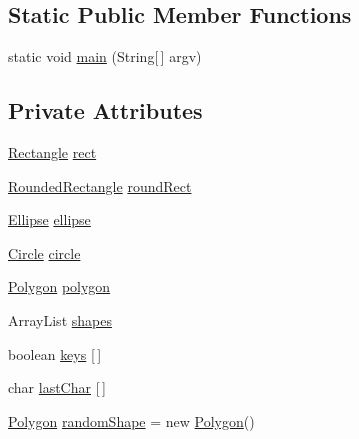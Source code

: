 \subsection*{Static Public Member Functions}
\begin{DoxyCompactItemize}
\item 
static void \mbox{\hyperlink{classorg_1_1newdawn_1_1slick_1_1tests_1_1_shape_test_a4dc07a1d24ad03f8f2927698b7334699}{main}} (String\mbox{[}$\,$\mbox{]} argv)
\end{DoxyCompactItemize}
\subsection*{Private Attributes}
\begin{DoxyCompactItemize}
\item 
\mbox{\hyperlink{classorg_1_1newdawn_1_1slick_1_1geom_1_1_rectangle}{Rectangle}} \mbox{\hyperlink{classorg_1_1newdawn_1_1slick_1_1tests_1_1_shape_test_a4b1ff3f26d40f4da99df6588a2ce932a}{rect}}
\item 
\mbox{\hyperlink{classorg_1_1newdawn_1_1slick_1_1geom_1_1_rounded_rectangle}{Rounded\+Rectangle}} \mbox{\hyperlink{classorg_1_1newdawn_1_1slick_1_1tests_1_1_shape_test_a8b3b14df1900a94b25ea41131c3fac22}{round\+Rect}}
\item 
\mbox{\hyperlink{classorg_1_1newdawn_1_1slick_1_1geom_1_1_ellipse}{Ellipse}} \mbox{\hyperlink{classorg_1_1newdawn_1_1slick_1_1tests_1_1_shape_test_a0337285e2634a3c36400453a8f963757}{ellipse}}
\item 
\mbox{\hyperlink{classorg_1_1newdawn_1_1slick_1_1geom_1_1_circle}{Circle}} \mbox{\hyperlink{classorg_1_1newdawn_1_1slick_1_1tests_1_1_shape_test_a61f5576f235a808e5a41242bedefbca0}{circle}}
\item 
\mbox{\hyperlink{classorg_1_1newdawn_1_1slick_1_1geom_1_1_polygon}{Polygon}} \mbox{\hyperlink{classorg_1_1newdawn_1_1slick_1_1tests_1_1_shape_test_a7a0198760bc6648bf9c28d35b102b7f1}{polygon}}
\item 
Array\+List \mbox{\hyperlink{classorg_1_1newdawn_1_1slick_1_1tests_1_1_shape_test_a860a3cef8eb3e35b677c5ccef30b3ecc}{shapes}}
\item 
boolean \mbox{\hyperlink{classorg_1_1newdawn_1_1slick_1_1tests_1_1_shape_test_abd8d1f480191272d0dc2ad5c9afe14fc}{keys}} \mbox{[}$\,$\mbox{]}
\item 
char \mbox{\hyperlink{classorg_1_1newdawn_1_1slick_1_1tests_1_1_shape_test_aa11ba24feb162758d3f48efbab64f26a}{last\+Char}} \mbox{[}$\,$\mbox{]}
\item 
\mbox{\hyperlink{classorg_1_1newdawn_1_1slick_1_1geom_1_1_polygon}{Polygon}} \mbox{\hyperlink{classorg_1_1newdawn_1_1slick_1_1tests_1_1_shape_test_a6a63648419db86ebc316f549aef8254a}{random\+Shape}} = new \mbox{\hyperlink{classorg_1_1newdawn_1_1slick_1_1geom_1_1_polygon}{Polygon}}()
\end{DoxyCompactItemize}
